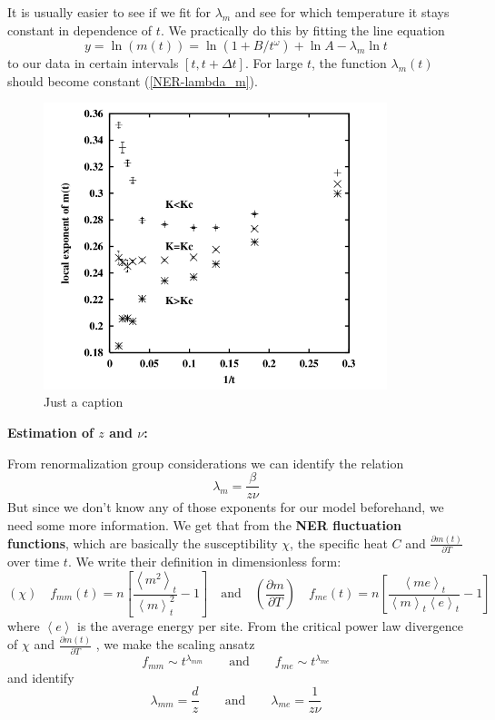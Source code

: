 	It is usually easier to see if we fit for $\lambda_m$ and see for which temperature it stays constant in dependence of $t$. We practically do this by fitting the line equation
	\begin{equation}
		y =	\ln \left(m(t)\right) =	\ln \left(1 + B /	t^\omega \right) + \ln A - \lambda_m \ln t
	\end{equation}
	to our data in certain intervals $\left[t, t + \Delta t\right]$. For large $t$, the function $\lambda_m(t)$ should become constant (\autoref{NER-lambda_m}).
	\begin{figure}[htp]
		\centering
		\includegraphics[width=10cm]{graphics/NER-lambda_m.png}
		\caption{Just a caption}
		\label{NER-lambda_m}
	\end{figure}
	
	\textbf{Estimation of $z$ and $\nu$:}
	
	From renormalization group considerations \cite{ozeki2007nonequilibrium} we can identify the relation
	\begin{equation}
		\lambda_m =	\frac{\beta}{z \nu}
	\end{equation}
	But since we don't know any of those exponents for our model beforehand, we need some more information. We get that from the \textbf{NER	fluctuation functions}, which are basically the susceptibility $\chi$, the specific heat $C$ and $\frac{\partial m(t)}{\partial T}$ over time $t$. We write their definition in dimensionless form:
	\begin{equation}
		(\chi) \quad f_{mm}(t) =	n \left[\frac{\left\langle m^2\right \rangle_t}{\left\langle m\right \rangle_t^2} - 1 \right] \quad \text{and} \quad \left(\frac{\partial m}{\partial T}\right) \quad f_{me}(t) =	n \left[\frac{\left\langle me\right \rangle_t}{\left\langle m\right \rangle_t  \left\langle e \right \rangle_t} - 1 \right]
	\end{equation}
	where $ \left\langle e \right \rangle$ is the average energy per site. From the critical power law divergence of $\chi$ and $\frac{\partial m(t)}{\partial T}$ \cite{sadiq1984dynamics}, we make the scaling ansatz
	\begin{equation}
		f_{mm} \sim t^{\lambda_{mm}} \qquad \text{and} \qquad f_{me} \sim t^{\lambda_{me}}
	\end{equation}
	and identify
	\begin{equation}
		\lambda_{mm} =	\frac{d}{z} \qquad \text{and} \qquad \lambda_{me} =	\frac{1}{z \nu}
	\end{equation}
	
